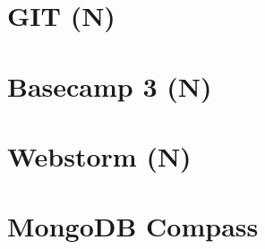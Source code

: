 \section{GIT (N)}

\newpage
\section{Basecamp 3 (N)}


\section{Webstorm (N)}


\section{MongoDB Compass}
